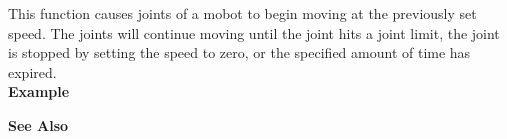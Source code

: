 This function causes joints of a mobot to begin moving at the previously set
speed. The joints will continue moving until the joint hits a joint limit, 
the joint is stopped by setting the speed to zero, or the specified amount of
time has expired. \\

\noindent
{\bf Example}\\
\noindent

\noindent
{\bf See Also}\\


